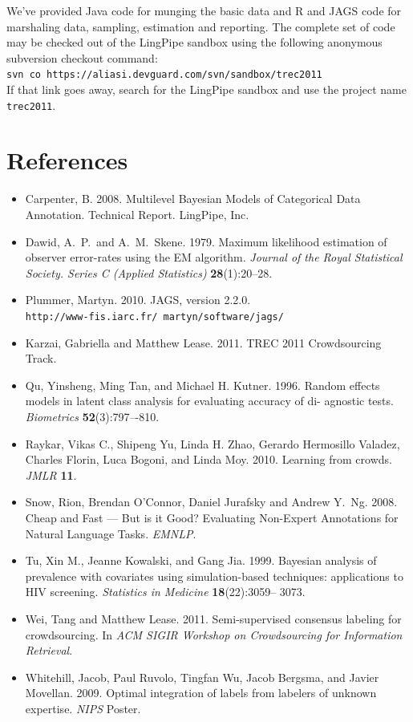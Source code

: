 \documentclass{article}
\begin{document}
We've provided Java code for munging the basic data and R and JAGS
code for marshaling data, sampling, estimation and reporting.  The
complete set of code may be checked out of the LingPipe sandbox
using the following anonymous subversion checkout command:
\\
\hspace*{24pt}
{\tt svn co https://aliasi.devguard.com/svn/sandbox/trec2011}
\\
If that link goes away, search for the LingPipe sandbox and use
the project name {\tt trec2011}.

\section*{References}

\begin{itemize}
%
\item Carpenter, B. 2008. Multilevel Bayesian Models of
Categorical Data Annotation.  Technical Report.  LingPipe, Inc.
%
\item Dawid, A.~P.\ and A.~M.~Skene. 1979.  Maximum likelihood
estimation of observer error-rates using the EM algorithm.  {\it
Journal of the Royal Statistical Society. Series C (Applied
Statistics)} {\bf 28}(1):20--28.
%
\item Plummer, Martyn. 2010.  JAGS, version 2.2.0. 
\\ {\tt http://www-fis.iarc.fr/~martyn/software/jags/}
%
\item Karzai, Gabriella and Matthew Lease. 2011.  TREC 2011
Crowdsourcing Track.
%
\item
Qu, Yinsheng, Ming Tan, and Michael H. Kutner. 1996. Random effects
models in latent class analysis for evaluating accuracy of di-
agnostic tests. {\it Biometrics} {\bf 52}(3):797–-810.
%
\item
Raykar, Vikas C., Shipeng Yu, Linda H. Zhao, Gerardo Hermosillo
Valadez, Charles Florin, Luca Bogoni, 
and Linda Moy.  2010. Learning from crowds. {\it JMLR} {\bf 11}.
%
\item Snow, Rion, Brendan O'Connor, Daniel Jurafsky and Andrew
Y.~Ng. 2008. 
Cheap and Fast --- But is it Good? Evaluating Non-Expert Annotations
for Natural Language Tasks. 
{\it EMNLP}.
%
\item 
Tu, Xin M., Jeanne Kowalski, and Gang Jia. 1999.
Bayesian analysis of prevalence with covariates using simulation-based
techniques: applications to HIV screening. 
{\it Statistics in Medicine} {\bf 18}(22):3059– 3073.
%
\item Wei, Tang and Matthew Lease. 2011.  Semi-supervised consensus
labeling for crowdsourcing. In {\it ACM SIGIR Workshop on Crowdsourcing for
Information Retrieval}.
%
\item Whitehill, Jacob, Paul Ruvolo, Tingfan Wu, Jacob Bergsma, and
Javier Movellan. 2009. Optimal integration of labels from labelers of
unknown expertise. {\it NIPS} Poster. 
%
\end{itemize}
\end{document}
